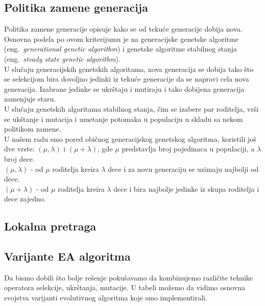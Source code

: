 \documentclass{article}
\begin{document}
\subsection{Politika zamene generacija}
 \label{sec:ea_zamena}
 Politika zamene generacije \cite{vi_Janicic} opisuje kako se od tekuće generacije dobija nova. Osnovna podela po ovom kriterijumu je na generacijske genetske algoritme (eng.~{\em generational genetic algorithm}) i genetske algoritme stabilnog stanja (eng.~{\em steady state genetic algorithm}). \\
 
 U slučaju generacijskih genetskih algoritama, nova generacija se dobija tako što se selekcijom bira dovoljno jedinki iz tekuće generacije da se napravi cela nova generacija. Izabrane jedinke se ukrštaju i mutiraju i tako dobijena generacija zamenjuje staru. \\
 
 U slučaju genetskih algoritama stabilnog stanja, čim se izabere par roditelja, vrši se ukštanje i mutacija i umetanje potomaka u populaciju u skladu sa nekom politikom zamene. \\
 
 U našem radu smo pored običnog generacijskog genetskog algoritma, koristili još dve vrste: $(\mu, \lambda) $ i $(\mu + \lambda)$, gde $\mu$ predstavlja broj pojedinaca u populaciji, a $\lambda$ broj dece. \\
 
 $(\mu, \lambda)$ - od $\mu$ roditelja kreira $\lambda$ dece i za novu generaciju se uzimaju  najbolji od dece.\\
 
$(\mu + \lambda)$ - od $\mu$ roditelja kreira $\lambda$ dece i bira najbolje jedinke iz skupa roditelja i dece zajedno.

\subsection{Lokalna pretraga}
 \label{sec:ea_lokalna_pretraga}

\subsection{Varijante EA algoritma}
\label{sec:ea_varijante}

Da bismo dobili što bolje rešenje pokušavamo da kombinujemo različite tehnike operatora selekcije, ukrštanja, mutacije. U tabeli možemo da vidimo osnovna svojstva varijanti evolutivnog algoritma koje smo implementirali.
 
\end{document}
